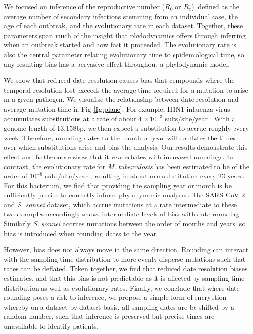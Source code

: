 \documentclass{article}
\begin{document}
\begin{spacing}{1.5}
We focused on inference of the reproductive number ($R_0$ or $R_e$), defined as the average number of secondary infections stemming from an individual case, the age of each outbreak, and the evolutionary rate in each dataset. Together, these parameters span much of the insight that phylodynamics offers through inferring when an outbreak started and how fast it proceeded. The evolutionary rate is also the central parameter relating evolutionary time to epidemiological time, so any resulting bias has a pervasive effect throughout a phylodynamic model.

 We show that reduced date resolution causes bias that compounds where the temporal resolution lost exceeds the average time required for a mutation to arise in a given pathogen. We visualise the relationship between date resolution and average mutation time in Fig \ref{fig:plane}. For example, H1N1 influenza virus accumulates substitutions at a rate of about 4 $\times10^{-3}$ subs/site/year \citep{hedge_2013_real-time}. With a genome length of 13,158bp, we then expect a substitution to accrue roughly every week. Therefore, rounding dates to the month or year will conflates the times over which substitutions arise and bias the analysis. Our results demonstrate this effect and furthermore show that it exacerbates with increased roundingr. In contrast, the evolutionary rate for \textit{M. tuberculosis} has been estimated to be of the order of $10^{-8}$ subs/site/year \citep{menardo2019molecular}, resulting in about one substitution every 23 years. For this bacterium, we find that providing the sampling year or month is be sufficiently precise to correctly inform phylodynamic analyses. The SARS-CoV-2 and \textit{S. sonnei} dataset, which accrue mutations at a rate intermediate to these two examples accordingly shows intermediate levels of bias with date rounding. Similarly \textit{S. sonnei} accrues mutations between the order of months and years, so bias is introduced when rounding dates to the year.

 However, bias does not always move in the same direction. Rounding can interact with the sampling time distribution to more evenly disperse mutations such that rates can be deflated. Taken together, we find that reduced date resolution biases estimates, and that this bias is not predictable as it is affected by sampling time distribution as well as evolutionary rates. Finally, we conclude that where date rounding poses a risk to inference, we propose a simple form of encryption whereby on a dataset-by-dataset basis, all sampling dates are be shifted by a random number, such that inference is preserved but precise times are unavailable to identify patients.


\end{spacing}
\end{document}
